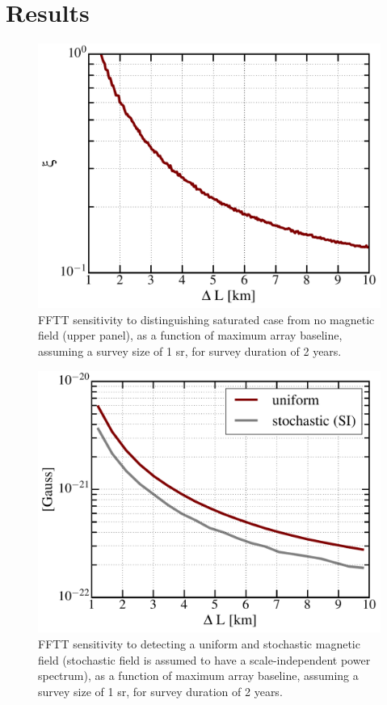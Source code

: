 \section{Results}
\label{sec:results}

\begin{figure}
\centering
\includegraphics[width=.35\textwidth,keepaspectratio=true]{xi_vs_deltas.pdf}
\caption{FFTT sensitivity to distinguishing saturated case from no magnetic field (upper panel), as a function of maximum array baseline, assuming a survey size of 1 sr, for survey duration of 2 years.\label{fig:sigma_vs_deltas}}
\end{figure}
\begin{figure}
\centering
\includegraphics[width=.35\textwidth,keepaspectratio=true]{sigma_vs_deltas.pdf}
\caption{FFTT sensitivity to detecting a uniform and stochastic magnetic field (stochastic field is assumed to have a scale-independent power spectrum), as a function of maximum array baseline, assuming a survey size of 1 sr, for survey duration of 2 years.\label{fig:sigma_vs_deltas}}
\end{figure}

